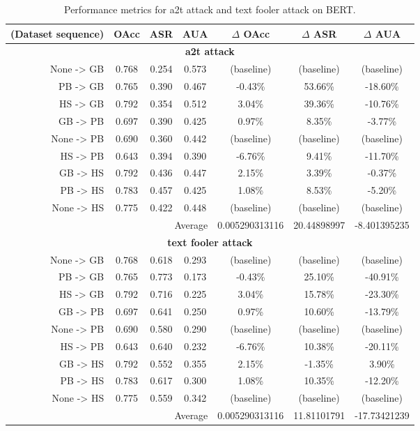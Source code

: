 \documentclass{article}
\begin{document}
\begin{table}[ht]
\centering
\caption{Performance metrics for a2t attack and text fooler attack on BERT.}
\small
\begin{tabular}{r|ccc|ccc}
\hline
\textbf{(Dataset sequence)} & \textbf{OAcc} & \textbf{ASR} & \textbf{AUA} & \textbf{$\Delta$ OAcc} & \textbf{$\Delta$ ASR} & \textbf{$\Delta$ AUA} \\ \hline
\multicolumn{7}{c}{\textbf{a2t attack}} \\ \hline
None -> GB & 0.768 & 0.254 & 0.573 & (baseline) & (baseline) & (baseline) \\
PB -> GB & 0.765 & 0.390 & 0.467 & -0.43\% & 53.66\% & -18.60\% \\
HS -> GB & 0.792 & 0.354 & 0.512 & 3.04\% & 39.36\% & -10.76\% \\
GB -> PB & 0.697 & 0.390 & 0.425 & 0.97\% & 8.35\% & -3.77\% \\
None -> PB & 0.690 & 0.360 & 0.442 & (baseline) & (baseline) & (baseline) \\
HS -> PB & 0.643 & 0.394 & 0.390 & -6.76\% & 9.41\% & -11.70\% \\
GB -> HS & 0.792 & 0.436 & 0.447 & 2.15\% & 3.39\% & -0.37\% \\
PB -> HS & 0.783 & 0.457 & 0.425 & 1.08\% & 8.53\% & -5.20\% \\
None -> HS & 0.775 & 0.422 & 0.448 & (baseline) & (baseline) & (baseline) \\ \hline
\multicolumn{4}{r|}{Average} & 0.005290313116 & 20.44898997 & -8.401395235 \\ \hline
\multicolumn{7}{c}{\textbf{text fooler attack}} \\ \hline
None -> GB & 0.768 & 0.618 & 0.293 & (baseline) & (baseline) & (baseline) \\
PB -> GB & 0.765 & 0.773 & 0.173 & -0.43\% & 25.10\% & -40.91\% \\
HS -> GB & 0.792 & 0.716 & 0.225 & 3.04\% & 15.78\% & -23.30\% \\
GB -> PB & 0.697 & 0.641 & 0.250 & 0.97\% & 10.60\% & -13.79\% \\
None -> PB & 0.690 & 0.580 & 0.290 & (baseline) & (baseline) & (baseline) \\
HS -> PB & 0.643 & 0.640 & 0.232 & -6.76\% & 10.38\% & -20.11\% \\
GB -> HS & 0.792 & 0.552 & 0.355 & 2.15\% & -1.35\% & 3.90\% \\
PB -> HS & 0.783 & 0.617 & 0.300 & 1.08\% & 10.35\% & -12.20\% \\
None -> HS & 0.775 & 0.559 & 0.342 & (baseline) & (baseline) & (baseline) \\ \hline
\multicolumn{4}{r|}{Average} & 0.005290313116 & 11.81101791 & -17.73421239 \\ \hline
\end{tabular}
\label{table:bert_attack_comparison}
\end{table}
\end{document}
